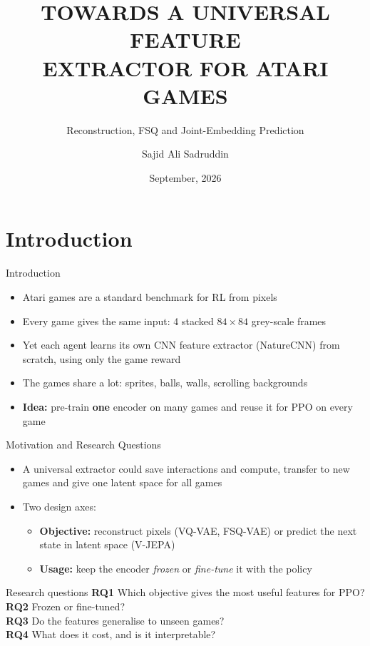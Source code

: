 \documentclass[aspectratio=43,10pt]{beamer}
\title[Universal Feature Extractor for Atari]{TOWARDS A UNIVERSAL FEATURE\\EXTRACTOR FOR ATARI GAMES}
\subtitle{Reconstruction, FSQ and Joint-Embedding Prediction}
\author{Sajid Ali Sadruddin}
\institute[Technische Universit\"at Dresden (TUD)]{Technische Universit\"at Dresden (TUD)}
\date{September, 2026}
\begin{document}
\begin{frame}
  \titlepage
\end{frame}

\begin{frame}
  \vfill
  \tableofcontents
  \vfill
\end{frame}

\section{Introduction}

\begin{frame}{Introduction}
  \begin{itemize}\setlength\itemsep{0.6em}
    \item Atari games are a standard benchmark for RL from pixels
    \item Every game gives the same input: 4 stacked $84\times84$ grey-scale frames
    \item Yet each agent learns its own CNN feature extractor (NatureCNN) from scratch,
          using only the game reward
    \item The games share a lot: sprites, balls, walls, scrolling backgrounds
    \item \textbf{Idea:} pre-train \textbf{one} encoder on many games and reuse it for
          PPO on every game
  \end{itemize}
\end{frame}

\begin{frame}{Motivation and Research Questions}
  \begin{itemize}\setlength\itemsep{0.4em}
    \item A universal extractor could save interactions and compute, transfer to new games
          and give one latent space for all games
    \item Two design axes:
      \begin{itemize}
        \item \textbf{Objective:} reconstruct pixels (VQ-VAE, FSQ-VAE) or predict the next
              state in latent space (V-JEPA)
        \item \textbf{Usage:} keep the encoder \emph{frozen} or \emph{fine-tune} it with the policy
      \end{itemize}
  \end{itemize}
  \vspace{0.3em}
  \begin{block}{Research questions}
    \small
    \textbf{RQ1} Which objective gives the most useful features for PPO?\\
    \textbf{RQ2} Frozen or fine-tuned?\\
    \textbf{RQ3} Do the features generalise to unseen games?\\
    \textbf{RQ4} What does it cost, and is it interpretable?
  \end{block}
\end{frame}
\end{document}
